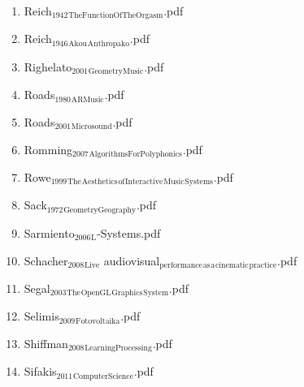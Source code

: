 \documentclass[11pt]{article}
\begin{document}
\begin{enumerate}
\begin{enumerate}
\begin{enumerate}
\begin{enumerate}
\begin{enumerate}
\item Reich$_{\text{1942}}$$_{\text{TheFunctionOfTheOrgasm}}$.pdf
\label{sec-1-1-1-1-7-1-1-89}

\item Reich$_{\text{1946}}$$_{\text{Akou}}$$_{\text{Anthropako}}$.pdf
\label{sec-1-1-1-1-7-1-1-90}

\item Righelato$_{\text{2001}}$$_{\text{GeometryMusic}}$.pdf
\label{sec-1-1-1-1-7-1-1-91}

\item Roads$_{\text{1980}}$$_{\text{ARMusic}}$.pdf
\label{sec-1-1-1-1-7-1-1-92}

\item Roads$_{\text{2001}}$$_{\text{Microsound}}$.pdf
\label{sec-1-1-1-1-7-1-1-93}

\item Romming$_{\text{2007}}$$_{\text{AlgorithmsForPolyphonics}}$.pdf
\label{sec-1-1-1-1-7-1-1-94}

\item Rowe$_{\text{1999}}$$_{\text{The}}$$_{\text{Aesthetics}}$$_{\text{of}}$$_{\text{Interactive}}$$_{\text{Music}}$$_{\text{Systems}}$.pdf
\label{sec-1-1-1-1-7-1-1-95}

\item Sack$_{\text{1972}}$$_{\text{GeometryGeography}}$.pdf
\label{sec-1-1-1-1-7-1-1-96}

\item Sarmiento$_{\text{2006}}$$_{\text{L}}$-Systems.pdf
\label{sec-1-1-1-1-7-1-1-97}

\item Schacher$_{\text{2008}}$$_{\text{Live}}$ audiovisual$_{\text{performance}}$$_{\text{as}}$$_{\text{a}}$$_{\text{cinematic}}$$_{\text{practice}}$.pdf
\label{sec-1-1-1-1-7-1-1-98}

\item Segal$_{\text{2003}}$$_{\text{The}}$$_{\text{OpenGL}}$$_{\text{Graphics}}$$_{\text{System}}$.pdf
\label{sec-1-1-1-1-7-1-1-99}

\item Selimis$_{\text{2009}}$$_{\text{Fotovoltaika}}$.pdf
\label{sec-1-1-1-1-7-1-1-100}

\item Shiffman$_{\text{2008}}$$_{\text{LearningProcessing}}$.pdf
\label{sec-1-1-1-1-7-1-1-101}

\item Sifakis$_{\text{2011}}$$_{\text{ComputerScience}}$.pdf
\label{sec-1-1-1-1-7-1-1-102}


\end{enumerate}
\end{enumerate}
\end{enumerate}
\end{enumerate}
\end{enumerate}
\end{document}
